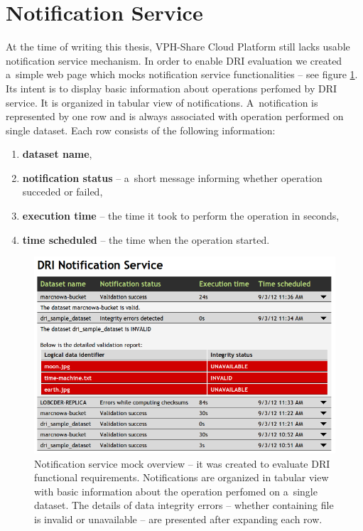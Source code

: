 \section{Notification Service}
\label{notification-service}
At the time of writing this thesis, VPH-Share Cloud Platform still lacks usable notification service
mechanism. In order to enable DRI evaluation we created a~simple web page which mocks
notification service functionalities -- see figure \ref{fig:notification-service}. Its intent
is to display basic information about operations perfomed by DRI service. It is organized in
tabular view of notifications. A~notification is represented by one row and is always associated
with operation performed on single dataset. Each row consists of the following information:

\begin{enumerate}
\item \textbf{dataset name},
\item \textbf{notification status} -- a~short message informing whether operation succeded or failed,
\item \textbf{execution time} -- the time it took to perform the operation in seconds,
\item \textbf{time scheduled} -- the time when the operation started.
\end{enumerate}

\begin{figure}[h!]
	\centering
	\includegraphics[width=\textwidth]{images/notification-service.png}
	\caption{Notification service mock overview -- it was created to evaluate DRI
	functional requirements. Notifications are organized in tabular view with
	basic information about the operation perfomed on a~single dataset. The details
	of data integrity errors -- whether containing file is invalid or unavailable --
	are presented after expanding each row.}
	\label{fig:notification-service}
\end{figure}

